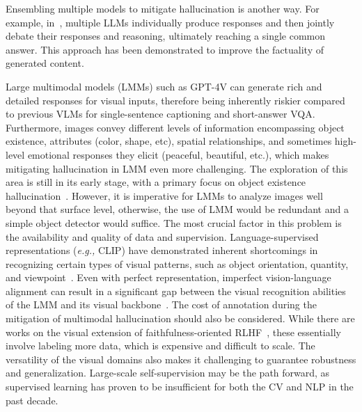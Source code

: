 Ensembling multiple models to mitigate hallucination is another way. 
For example, in~, multiple LLMs individually produce responses and then jointly debate their responses and reasoning, ultimately reaching a single common answer. This approach has been demonstrated to improve the factuality of generated content.



Large multimodal models (LMMs) such as GPT-4V can generate rich and detailed responses for visual inputs, therefore being inherently riskier compared to previous VLMs for single-sentence captioning and short-answer VQA. Furthermore,  images convey different levels of information encompassing object existence, attributes (color, shape, etc), spatial relationships, and sometimes high-level emotional responses they elicit (peaceful, beautiful, etc.), which makes mitigating hallucination in LMM even more challenging. The exploration of this area is still in its early stage, with a primary focus on object existence hallucination~. However, it is imperative for LMMs to analyze images well beyond that surface level, otherwise, the use of LMM would be redundant and a simple object detector would suffice. The most crucial factor in this problem is the availability and quality of data and supervision. Language-supervised representations (\textit{e.g.,} CLIP) have demonstrated inherent shortcomings in recognizing certain types of visual patterns, such as object orientation, quantity, and viewpoint~. Even with perfect representation, imperfect vision-language alignment can result in a significant gap between the visual recognition abilities of the LMM and its visual backbone~. The cost of annotation during the mitigation of multimodal hallucination should also be considered. While there are works on the visual extension of faithfulness-oriented RLHF~, these essentially involve labeling more data, which is expensive and difficult to scale. The versatility of the visual domains also makes it challenging to guarantee robustness and generalization. Large-scale self-supervision may be the path forward, as supervised learning has proven to be insufficient for both the CV and NLP in the past decade.

